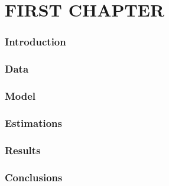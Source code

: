 
\part{FIRST CHAPTER}
\section{Introduction}
\blindtext

\section{Data}
\blindtext

\section{Model}
\blindtext

\section{Estimations} 
\blindtext

\section{Results}
\blindtext

\section{Conclusions}
\blindtext